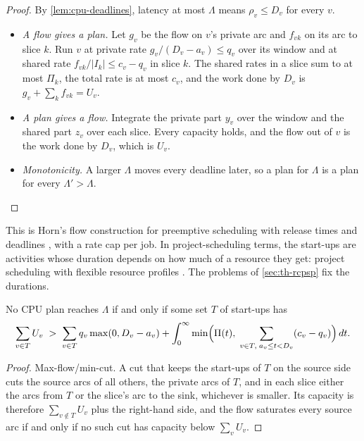 \begin{proof}
By \cref{lem:cpu-deadlines}, latency at most $\Lambda$ means $\rho_v \le D_v$ for every $v$.
\begin{itemize}
  \item \emph{A flow gives a plan.} Let $g_v$ be the flow on $v$'s private arc and $f_{vk}$ on
        its arc to slice $k$. Run $v$ at private rate $g_v / (D_v - a_v) \le q_v$ over its window
        and at shared rate $f_{vk} / |I_k| \le c_v - q_v$ in slice $k$. The shared rates in a
        slice sum to at most $\Pi_k$, the total rate is at most $c_v$, and the work done by $D_v$ is
        $g_v + \sum_k f_{vk} = U_v$.
  \item \emph{A plan gives a flow.} Integrate the private part $y_v$ over the window and the
        shared part $z_v$ over each slice. Every capacity holds, and the flow out of $v$ is the
        work done by $D_v$, which is $U_v$.
  \item \emph{Monotonicity.} A larger $\Lambda$ moves every deadline later, so a plan for
        $\Lambda$ is a plan for every $\Lambda' > \Lambda$. \qedhere
\end{itemize}
\end{proof}

This is Horn's flow construction for preemptive scheduling with release times and deadlines
\cite{horn1974}, with a rate cap per job. In project-scheduling terms, the start-ups are
activities whose duration depends on how much of a resource they get: project scheduling with
flexible resource profiles \cite{naber2014}. The problems of \cref{sec:th-rcpsp} fix the
durations.

\begin{corollary}[A certificate]
\label{cor:cpu-cut}
No CPU plan reaches $\Lambda$ if and only if some set $T$ of start-ups has
\[
  \sum_{v \in T} U_v \;>\; \sum_{v \in T} q_v \max(0, D_v - a_v)
  + \int_0^\infty \min\Bigl(\Pi(t),\; \sum_{v \in T,\; a_v \le t < D_v} (c_v - q_v)\Bigr)\, dt .
\]
\end{corollary}

\begin{proof}
Max-flow/min-cut. A cut that keeps the start-ups of $T$ on the source side cuts the source arcs
of all others, the private arcs of $T$, and in each slice either the arcs from $T$ or the slice's
arc to the sink, whichever is smaller. Its capacity is therefore
$\sum_{v \notin T} U_v$ plus the right-hand side, and the flow saturates every source arc if and
only if no such cut has capacity below $\sum_v U_v$.
\end{proof}

